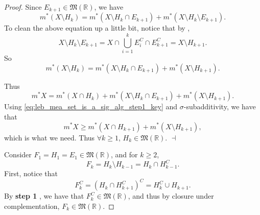 \documentclass[notoc,notitlepage]{tufte-book}
\begin{document}
\begin{proof}
  Since $E_{k + 1} \in \mathfrak{M}(\mathbb{R})$, we have
  \begin{equation*}
    m^* (X \setminus H_k) = m^* ( X \setminus H_k \cap E_{k+1} ) + m^* ( X
    \setminus H_k \setminus E_{k+1} ).
  \end{equation*}
  To clean the above equation up a little bit, notice that by ,
  \begin{equation*}
    X \setminus H_k \setminus E_{k+1} = X \cap \bigcup_{i=1}^{k} E_i^C \cap
    E_{k+1}^C = X \setminus H_{k + 1}.
  \end{equation*}
  So
  \begin{equation*}
    m^* (X \setminus H_k) = m^* ( X \setminus H_k \cap E_{k+1} ) + m^* ( X
    \setminus H_{k + 1} ).
  \end{equation*}

  Thus
  \begin{equation*}
    m^* X = m^* (X \cap H_k) + m^*(X \setminus H_k \cap E_{k+1}) + m^*(X
    \setminus H_{k+1}).
  \end{equation*}
  Using \cref{eq:leb_mea_set_is_a_sig_alg_step1_key} and $\sigma$-subadditivity,
  we have that
  \begin{equation*}
    m^* X \geq m^* ( X \cap H_{k + 1} ) + m^* ( X \setminus H_{k+1} ),
  \end{equation*}
  which is what we need. Thus $\forall k \geq 1$, $H_k \in
  \mathfrak{M}(\mathbb{R})$. $\dashv$

  \noindent
   Consider $F_1 = H_1 = E_1 \in \mathfrak{M}(\mathbb{R})$,
  and for $k \geq 2$,
  \begin{equation*}
    F_k = H_k \setminus H_{k-1} = H_k \cap H_{k-1}^{C}.
  \end{equation*}
  First, notice that
  \begin{equation*}
    F_k^C = \left( H_k \cap H_{k+1}^C \right)^C = H_k^C \cup H_{k+1}.
  \end{equation*}
  By \textbf{step 1} , we have
  that $F_k^C \in \mathfrak{M}(\mathbb{R})$, and thus by closure under
  complementation, $F_k \in \mathfrak{M}(\mathbb{R})$.


\end{proof}
\end{document}
